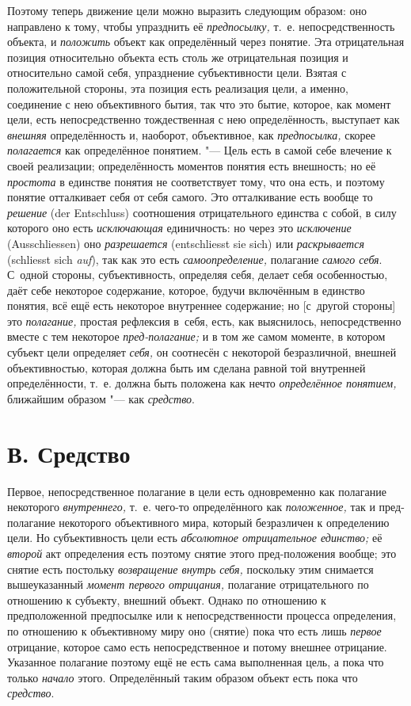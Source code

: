 Поэтому теперь движение цели можно выразить следующим образом: оно направлено
к тому, чтобы упразднить её {\em предпосылку,} т.~е. непосредственность
объекта, и {\em положить} объект как
определённый через понятие. Эта отрицательная позиция относительно объекта
есть столь же отрицательная позиция и относительно самой себя, упразднение
субъективности цели. Взятая с положительной стороны, эта позиция есть
реализация цели, а именно, соединение с нею объективного бытия, так что это
бытие, которое, как момент цели, есть непосредственно тождественная с нею
определённость, выступает как {\em внешняя}
определённость и, наоборот, объективное, как
{\em предпосылка,} скорее {\em полагается} как
определённое понятием. "--- Цель есть в самой себе влечение к
своей реализации; определённость моментов понятия есть внешность; но её
{\em простота} в единстве
понятия не соответствует тому, что она есть, и поэтому понятие отталкивает
себя от себя самого. Это отталкивание есть вообще то
{\em решение} (der Entschluss)
соотношения отрицательного единства с собой, в силу которого
оно есть {\em исключающая} единичность: но через это
{\em исключение} (Aus\-schliessen) оно {\em разрешается}
(ent\-schliesst sie sich) или {\em раскрывается} (schliesst sich
{\em auf}), так как это есть {\em самоопределение,} полагание {\em самого
себя}. С~одной стороны, субъективность, определяя себя,
делает себя особенностью, даёт себе некоторое содержание, которое, будучи
включённым в единство понятия, всё ещё есть некоторое внутреннее
содержание; но [с~другой стороны] это {\em полагание,} простая
рефлексия в~себя, есть, как выяснилось, непосредственно вместе с тем
некоторое {\em пред-полагание;} и в том же самом моменте, в котором субъект
цели определяет {\em себя,} он соотнесён
с некоторой безразличной, внешней объективностью, которая должна быть им
сделана равной той внутренней определённости, т.~е. должна быть положена как
нечто {\em определённое понятием,} ближайшим образом "--- как {\em средство}.

\section[В. Средство]{В. Средство}

Первое, непосредственное полагание в цели есть одновременно
как полагание некоторого {\em внутреннего,} т.~е.
чего-то определённого как {\em положенное,} так и
пред-полагание некоторого объективного мира, который безразличен к
определению цели. Но субъективность цели есть
{\em абсолютное отрицательное единство;} её {\em второй} акт
определения есть поэтому снятие этого пред-положения вообще; это
снятие есть постольку {\em возвращение внутрь себя,}
поскольку этим снимается вышеуказанный {\em момент первого отрицания,}
полагание отрицательного по отношению к субъекту, внешний
объект. Однако по отношению к предположенной предпосылке или к
непосредственности процесса определения, по отношению к объективному миру
оно (снятие) пока что есть лишь {\em первое} отрицание, которое само есть
непосредственное и потому внешнее отрицание. Указанное полагание поэтому ещё
не есть сама выполненная цель, а пока что только {\em начало} этого.
Определённый таким образом объект есть пока что {\em средство}.

